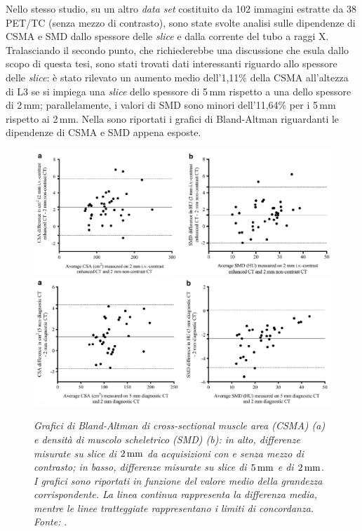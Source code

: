 Nello stesso studio, su un altro \textit{data set} costituito da 102 immagini estratte da 38 PET/TC (senza mezzo di contrasto), sono state svolte analisi sulle dipendenze di CSMA e SMD dallo spessore delle \textit{slice} e dalla corrente del tubo a raggi X. Tralasciando il secondo punto, che richiederebbe una discussione che esula dallo scopo di questa tesi, sono stati trovati dati interessanti riguardo allo spessore delle \textit{slice}: è stato rilevato un aumento medio dell'1,11\% della CSMA all'altezza di L3 se si impiega una \textit{slice} dello spessore di 5\,mm rispetto a una dello spessore di 2\,mm; parallelamente, i valori di SMD sono minori dell'11,64\% per i 5\,mm rispetto ai 2\,mm. Nella  sono riportati i grafici di Bland-Altman riguardanti le dipendenze di CSMA e SMD appena esposte.
\begin{figure}[H]
\centering
\includegraphics[scale=0.78]{Immagini/fuchs_contrasto.png}\quad\includegraphics[scale=0.61]{Immagini/fuchs_spessore.png}
\caption{\label{fig:fuchs_ba} \textit{Grafici di Bland-Altman di cross-sectional muscle area (CSMA) (a) e densità di muscolo scheletrico (SMD) (b): in alto, differenze misurate su slice di $2\,\textnormal{mm}$ da acquisizioni con e senza mezzo di contrasto; in basso, differenze misurate su slice di $5\,\textnormal{mm}$ e di $2\,\textnormal{mm}$. I grafici sono riportati in funzione del valore medio della grandezza corrispondente. La linea continua rappresenta la differenza media, mentre le linee tratteggiate rappresentano i limiti di concordanza. Fonte:} \cite{Fuchs2018}.}
\end{figure}


